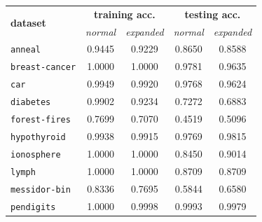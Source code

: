 \documentclass[12pt]{report}
\theoremstyle{definition}
\theoremstyle{definition}
\theoremstyle{definition}
\begin{document}
\begin{table}[ht]
    \centering
    \begin{tabular}{lcccc}
    \hline
    \multicolumn{1}{l}{\multirow{2}{*}{\bf dataset}} & \multicolumn{2}{c}{\bf training acc.} & \multicolumn{2}{c}{\bf testing acc.} \\
    \multicolumn{1}{l}{} & \multicolumn{1}{p{2cm}}{\centering \it normal} & \multicolumn{1}{p{2cm}}{\centering \it expanded} & \multicolumn{1}{p{2cm}}{\centering \it normal} & \multicolumn{1}{p{2cm}}{\centering \it expanded} \\
    \hline
    \multicolumn{1}{l}{\tt anneal}        & \multicolumn{1}{c}{0.9445} & \multicolumn{1}{c}{0.9229} & \multicolumn{1}{c}{0.8650} & \multicolumn{1}{c}{0.8588} \\
    \multicolumn{1}{l}{\tt breast-cancer} & \multicolumn{1}{c}{1.0000} & \multicolumn{1}{c}{1.0000} & \multicolumn{1}{c}{0.9781} & \multicolumn{1}{c}{0.9635} \\
    \multicolumn{1}{l}{\tt car}           & \multicolumn{1}{c}{0.9949} & \multicolumn{1}{c}{0.9920} & \multicolumn{1}{c}{0.9768} & \multicolumn{1}{c}{0.9624} \\
    \multicolumn{1}{l}{\tt diabetes}      & \multicolumn{1}{c}{0.9902} & \multicolumn{1}{c}{0.9234} & \multicolumn{1}{c}{0.7272} & \multicolumn{1}{c}{0.6883} \\
    \multicolumn{1}{l}{\tt forest-fires}  & \multicolumn{1}{c}{0.7699} & \multicolumn{1}{c}{0.7070} & \multicolumn{1}{c}{0.4519} & \multicolumn{1}{c}{0.5096} \\
    \multicolumn{1}{l}{\tt hypothyroid}   & \multicolumn{1}{c}{0.9938} & \multicolumn{1}{c}{0.9915} & \multicolumn{1}{c}{0.9769} & \multicolumn{1}{c}{0.9815} \\
    \multicolumn{1}{l}{\tt ionosphere}    & \multicolumn{1}{c}{1.0000} & \multicolumn{1}{c}{1.0000} & \multicolumn{1}{c}{0.8450} & \multicolumn{1}{c}{0.9014} \\
    \multicolumn{1}{l}{\tt lymph}         & \multicolumn{1}{c}{1.0000} & \multicolumn{1}{c}{1.0000} & \multicolumn{1}{c}{0.8709} & \multicolumn{1}{c}{0.8709} \\
    \multicolumn{1}{l}{\tt messidor-bin}  & \multicolumn{1}{c}{0.8336} & \multicolumn{1}{c}{0.7695} & \multicolumn{1}{c}{0.5844} & \multicolumn{1}{c}{0.6580} \\
    \multicolumn{1}{l}{\tt pendigits}     & \multicolumn{1}{c}{1.0000} & \multicolumn{1}{c}{0.9998} & \multicolumn{1}{c}{0.9993} & \multicolumn{1}{c}{0.9979} \\

\end{tabular}
\end{table}
\end{document}
